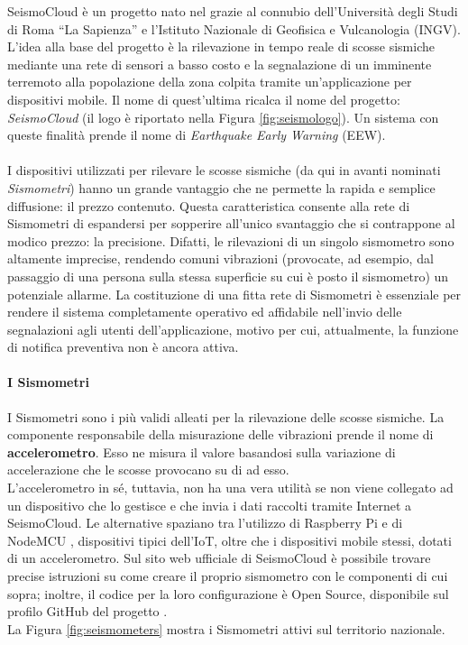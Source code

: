 SeismoCloud \cite{seismocloud} è un progetto nato nel grazie al connubio dell'Università degli Studi di Roma “La Sapienza” e l’Istituto Nazionale di Geofisica e Vulcanologia (INGV). L'idea alla base del progetto è la rilevazione in tempo reale di scosse sismiche mediante una rete di sensori a basso costo e la segnalazione di un imminente terremoto alla popolazione della zona colpita tramite un'applicazione per dispositivi mobile. Il nome di quest'ultima ricalca il nome del progetto: \textit{SeismoCloud} (il logo è riportato nella Figura \ref{fig:seismologo}). Un sistema con queste finalità prende il nome di \textit{Earthquake Early Warning} (EEW).\\
\\
I dispositivi utilizzati per rilevare le scosse sismiche (da qui in avanti nominati \textit{Sismometri}) hanno un grande vantaggio che ne permette la rapida e semplice diffusione: il prezzo contenuto. Questa caratteristica consente alla rete di Sismometri di espandersi per sopperire all'unico svantaggio che si contrappone al modico prezzo: la precisione. Difatti, le rilevazioni di un singolo sismometro sono altamente imprecise, rendendo comuni vibrazioni (provocate, ad esempio, dal passaggio di una persona sulla stessa superficie su cui è posto il sismometro) un potenziale allarme. La costituzione di una fitta rete di Sismometri è essenziale per rendere il sistema completamente operativo ed affidabile nell'invio delle segnalazioni agli utenti dell'applicazione, motivo per cui, attualmente, la funzione di notifica preventiva non è ancora attiva.

\paragraph{I Sismometri}
I Sismometri sono i più validi alleati per la rilevazione delle scosse sismiche. La componente responsabile della misurazione delle vibrazioni prende il nome di \textbf{accelerometro}. Esso ne misura il valore basandosi sulla variazione di accelerazione che le scosse provocano su di ad esso.\\
L'accelerometro in sé, tuttavia, non ha una vera utilità se non viene collegato ad un dispositivo che lo gestisce e che invia i dati raccolti tramite Internet a SeismoCloud. Le alternative spaziano tra l'utilizzo di Raspberry Pi \cite{rpi} e di NodeMCU \cite{nodemcu}, dispositivi tipici dell'IoT, oltre che i dispositivi mobile stessi, dotati di un accelerometro. Sul sito web ufficiale di SeismoCloud \cite{seismocloud} è possibile trovare precise istruzioni su come creare il proprio sismometro con le componenti di cui sopra; inoltre, il codice per la loro configurazione è Open Source, disponibile sul profilo GitHub del progetto \cite{seismogit}. \\
La Figura \ref{fig:seismometers} mostra i Sismometri attivi sul territorio nazionale.

